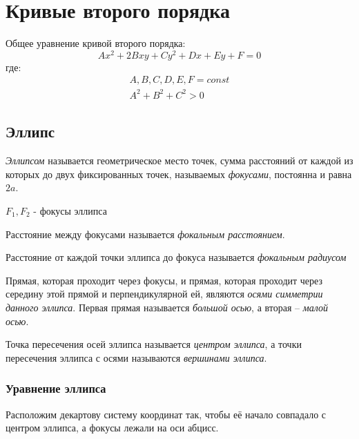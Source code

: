 \section{Кривые второго порядка}

Общее уравнение кривой второго порядка:
\[
  \boxed{Ax^2 + 2Bxy + Cy^2 + Dx + Ey + F = 0}
\] 
где:
\begin{gather*}
  A, B, C, D, E, F = const \\
  A^2 + B^2 + C^2 > 0
\end{gather*}

\subsection{Эллипс}

\begin{definition}
  \textit{Эллипсом} называется геометрическое место точек, сумма расстояний от каждой из которых до двух фиксированных точек, называемых \textit{фокусами}, постоянна и равна $2a$.
\end{definition}

$F_1, F_2$ - фокусы эллипса

Расстояние между фокусами называется \textit{фокальным расстоянием}.

Расстояние от каждой точки эллипса до фокуса называется \textit{фокальным радиусом} 

Прямая, которая проходит через фокусы, и прямая, которая проходит через середину этой прямой и перпендикулярной ей, являются \textit{осями симметрии данного эллипса}.
Первая прямая называется \textit{большой осью}, а вторая -- \textit{малой осью}.   

Точка пересечения осей эллипса называется \textit{центром эллипса}, а точки пересечения эллипса с осями называются \textit{вершинами эллипса}. 

\subsubsection*{Уравнение эллипса}

Расположим декартову систему координат так, чтобы её начало совпадало с центром эллипса, а фокусы лежали на оси абцисс.

